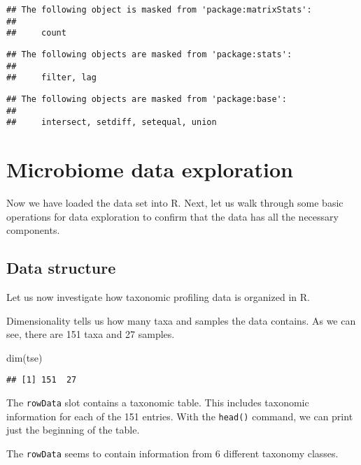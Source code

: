 \documentclass[
  oneside]{book}
\newenvironment{Shaded}{\begin{snugshade}}{\end{snugshade}}
\newcommand{\FunctionTok}[1]{\textcolor[rgb]{0.00,0.00,0.00}{#1}}
\newcommand{\NormalTok}[1]{#1}
\begin{document}
\begin{verbatim}
## The following object is masked from 'package:matrixStats':
## 
##     count
\end{verbatim}

\begin{verbatim}
## The following objects are masked from 'package:stats':
## 
##     filter, lag
\end{verbatim}

\begin{verbatim}
## The following objects are masked from 'package:base':
## 
##     intersect, setdiff, setequal, union
\end{verbatim}

\hypertarget{microbiome-data-exploration}{%
\chapter{Microbiome data exploration}\label{microbiome-data-exploration}}

Now we have loaded the data set into R. Next, let us walk through some
basic operations for data exploration to confirm that the data has all
the necessary components.

\hypertarget{data-structure}{%
\section{Data structure}\label{data-structure}}

Let us now investigate how taxonomic profiling data is organized in R.

Dimensionality tells us how many taxa and samples the data
contains. As we can see, there are 151 taxa and 27
samples.

\begin{Shaded}
\begin{Highlighting}[]
\FunctionTok{dim}\NormalTok{(tse)}
\end{Highlighting}
\end{Shaded}

\begin{verbatim}
## [1] 151  27
\end{verbatim}

The \texttt{rowData} slot contains a taxonomic table. This includes taxonomic
information for each of the 151 entries. With the \texttt{head()}
command, we can print just the beginning of the table.

The \texttt{rowData} seems to contain information from 6
different taxonomy classes.
\end{document}

